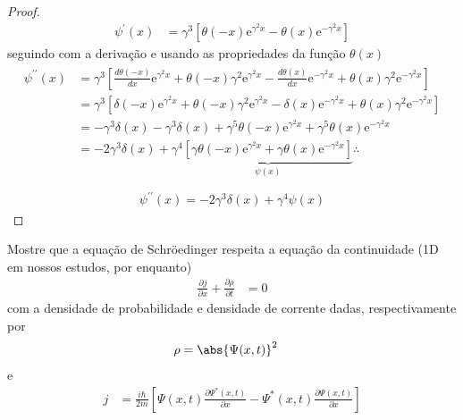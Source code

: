 \begin{prob}
\begin{sol}
\begin{enumerate}[label=\alph *)]
\begin{proof}
						\begin{align}
							\psi^{\prime}(x) &= \gamma^{3}\left[\theta(-x)\mathrm{e}^{\gamma^{2}x}-\theta(x)\mathrm{e}^{-\gamma^{2}x}\right]
						\end{align}
						seguindo com a derivação e usando as propriedades da função $\theta(x)$
						\begin{align}
							\begin{split}
								\psi^{\prime\prime}(x) &= \gamma^{3}\left[\frac{d\theta(-x)}{dx}\mathrm{e}^{\gamma^{2}x}+\theta(-x) \gamma^{2}\mathrm{e}^{\gamma^{2}x}-\frac{d\theta(x)}{dx}\mathrm{e}^{-\gamma^{2}x}+\theta(x) \gamma^{2}\mathrm{e}^{-\gamma^{2}x}\right]\\
																			 &= \gamma^{3}\left[\delta(-x)\mathrm{e}^{\gamma^{2}x}+\theta(-x) \gamma^{2}\mathrm{e}^{\gamma^{2}x}-\delta(x)\mathrm{e}^{-\gamma^{2}x}+\theta(x) \gamma^{2}\mathrm{e}^{-\gamma^{2}x}\right]\\
																			 &= -\gamma^{3} \delta(x)-\gamma^{3} \delta(x)+\gamma^{5}\theta(-x)\mathrm{e}^{\gamma^{2}x}+\gamma^{5}\theta(x)\mathrm{e}^{-\gamma^{2}x}\\
																			 &= -2 \gamma^{3} \delta(x)+\gamma^{4}\underbrace{\left[\gamma\theta(-x)\mathrm{e}^{\gamma^{2}x}+\gamma\theta(x)\mathrm{e}^{-\gamma^{2}x}\right]}_{\displaystyle\psi(x)}\therefore\\
							\end{split}
						\end{align}
						\begin{align}
							\boxed{
								\psi^{\prime\prime}(x) = -2 \gamma^{3} \delta(x)+\gamma^{4} \psi(x)
							}
						\end{align}
													
					\end{proof}
					
					

		\end{enumerate}


	\end{sol}
\end{prob}
\begin{prob}
	Mostre que a equação de Schröedinger respeita a equação da continuidade (1D em nossos estudos, por enquanto)	
	\begin{align}
		\frac{\partial j}{\partial x}+\frac{\partial \rho}{\partial t} &= 0
	\end{align}
	com a densidade de probabilidade e  densidade de corrente dadas, respectivamente por
	\begin{align}
		\rho &= \abs{\Psi(x,t)}^{2}
	\end{align}
	e
	\begin{align}
		j &= \frac{i \hbar}{2m}\left[\Psi(x,t)\frac{\partial \Psi^{*}(x,t)}{\partial x}-\Psi^{*}(x,t)\frac{\partial \Psi(x,t)}{\partial x}\right]
	\end{align}
\end{prob}

